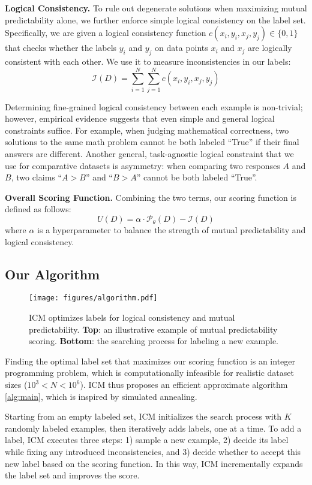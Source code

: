 \documentclass{article}
\newcommand{\ourmethod}[0]{\textsc{ICM}\xspace}
\begin{document}
\textbf{Logical Consistency.} 
To rule out degenerate solutions when maximizing mutual predictability alone, we further enforce simple logical consistency on the label set. Specifically, we are given a logical consistency function $c(x_i, y_i, x_j, y_j) \in \{ 0, 1 \}$ that checks whether the labels $y_i$ and $y_j$ on data points $x_i$ and $x_j$ are logically consistent with each other. We use it to measure inconsistencies in our labels:
$$\mathcal{I}(D) = \sum_{i=1}^N \sum_{j=1}^N c(x_i, y_i, x_j, y_j)$$

Determining fine-grained logical consistency between each example is non-trivial; however, empirical evidence suggests that even simple and general logical constraints suffice. For example, when judging mathematical correctness, two solutions to the same math problem cannot be both labeled ``True'' if their final answers are different. Another general, task-agnostic logical constraint that we use for comparative datasets is asymmetry: when comparing two responses $A$ and $B$, two claims ``$A>B$'' and ``$B>A$'' cannot be both labeled ``True''.


\textbf{Overall Scoring Function.} Combining the two terms, our scoring function is defined as follows:
$$U(D) = \alpha \cdot \mathcal{P}_\theta(D) - \mathcal{I}(D)$$
\label{eq:joint_prob}
where $\alpha$ is a hyperparameter to balance the strength of mutual predictability and logical consistency.


\subsection{Our Algorithm} 


\begin{figure}[!t]
    \centering
    \texttt{[image: figures/algorithm.pdf]}
    \caption{\ourmethod optimizes labels for logical consistency and mutual predictability. \textbf{Top}: an illustrative example of mutual predictability scoring. \textbf{Bottom}: the searching process for labeling a new example.}
    \label{fig:algorithm}
\end{figure}

Finding the optimal label set that maximizes our scoring function is an integer programming problem, which is computationally infeasible for realistic dataset sizes ($10^3<N<10^6$). \ourmethod thus proposes an efficient approximate algorithm \ref{alg:main}, which is inspired by simulated annealing.

Starting from an empty labeled set, \ourmethod initializes the search process with $K$ randomly labeled examples, then iteratively adds labels, one at a time. To add a label, \ourmethod executes three steps: 1) sample a new example, 2) decide its label while fixing any introduced inconsistencies, and 3) decide whether to accept this new label based on the scoring function. In this way, \ourmethod incrementally expands the label set and improves the score.
\end{document}
